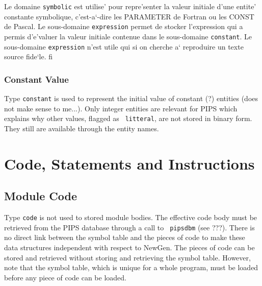 {\iffalse
Le domaine \verb/symbolic/ est utilise' pour repre'senter la valeur
initiale d'une entite' constante symbolique, c'est-a`-dire les PARAMETER
de Fortran ou les CONST de Pascal. Le sous-domaine \verb/expression/
permet de stocker l'expression qui a permis d'e'valuer la valeur
initiale contenue dans le sous-domaine \verb/constant/. Le sous-domaine
\verb/expression/ n'est utile qui si on cherche a` reproduire un texte
source fide`le.
fi

\subsubsection{Constant Value}
\label{subsubsection-constant}

{}

Type {\tt constant} is used to represent the initial value of constant
(?) entities (does not make sense to me...). Only integer entities are
relevant for PIPS which explains why other values, flagged as {\tt
litteral}, are not stored in binary form. They still are available
through the entity names.

\iffalse
Le domaine \verb/constant/ est utilise' pour repre'senter la valeur
initiale des entite's constantes. Seules les entite's de type entier
nous inte'ressent, ce qui explique qu'une constante puisse e^tre soit un
\verb/int/ soit un \verb/litteral/ dont on ne garde pas la valeur (type unit).
\fi

\section{Code, Statements and Instructions}
\label{code}

\subsection{Module Code}
\label{subsection-code}

{}

Type {\tt code} is not used to stored module bodies. The effective code
body must be retrieved from the PIPS database through a call to {\tt
pipsdbm} (see ???). There is no direct link between the symbol table and
the pieces of code to make these data structures independent with
respect to NewGen. The pieces of code can be stored and retrieved
without storing and retrieving the symbol table. However, note that the
symbol table, which is unique for a whole program, must be loaded before
any piece of code can be loaded.

}
